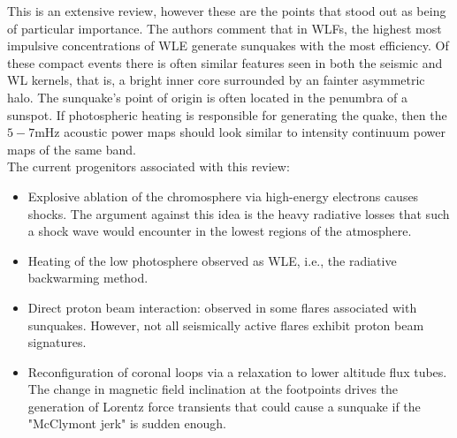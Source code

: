 This is an extensive review, however these are the points that stood out as being of particular importance. The authors comment that in WLFs, the highest most impulsive concentrations of WLE generate sunquakes with the most efficiency. Of these compact events there is often similar features seen in both the seismic and WL kernels, that is, a bright inner core surrounded by an fainter asymmetric halo. The sunquake's point of origin is often located in the penumbra of a sunspot. If photospheric heating is responsible for generating the quake, then the $5-7$mHz acoustic power maps should look similar to intensity continuum power maps of the same band.\\
The current progenitors associated with this review:
\begin{itemize}
\item Explosive ablation of the chromosphere via high-energy electrons causes shocks. The argument against this idea is the heavy radiative losses that such a shock wave would encounter in the lowest regions of the atmosphere.  
\item Heating of the low photosphere observed as WLE, i.e., the radiative backwarming method.
\item Direct proton beam interaction: observed in some flares associated with sunquakes. However, not all seismically active flares exhibit proton beam signatures. 
\item Reconfiguration of coronal loops via a relaxation to lower altitude flux tubes. The change in magnetic field inclination at the footpoints drives the generation of Lorentz force transients that could cause a sunquake if the "McClymont jerk" is sudden enough.
\end{itemize}


